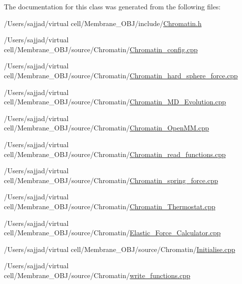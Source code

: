 The documentation for this class was generated from the following files\+:\begin{DoxyCompactItemize}
\item 
/\+Users/sajjad/virtual cell/\+Membrane\+\_\+\+O\+B\+J/include/\mbox{\hyperlink{Chromatin_8h}{Chromatin.\+h}}\item 
/\+Users/sajjad/virtual cell/\+Membrane\+\_\+\+O\+B\+J/source/\+Chromatin/\mbox{\hyperlink{Chromatin__config_8cpp}{Chromatin\+\_\+config.\+cpp}}\item 
/\+Users/sajjad/virtual cell/\+Membrane\+\_\+\+O\+B\+J/source/\+Chromatin/\mbox{\hyperlink{Chromatin__hard__sphere__force_8cpp}{Chromatin\+\_\+hard\+\_\+sphere\+\_\+force.\+cpp}}\item 
/\+Users/sajjad/virtual cell/\+Membrane\+\_\+\+O\+B\+J/source/\+Chromatin/\mbox{\hyperlink{Chromatin__MD__Evolution_8cpp}{Chromatin\+\_\+\+M\+D\+\_\+\+Evolution.\+cpp}}\item 
/\+Users/sajjad/virtual cell/\+Membrane\+\_\+\+O\+B\+J/source/\+Chromatin/\mbox{\hyperlink{Chromatin__OpenMM_8cpp}{Chromatin\+\_\+\+Open\+M\+M.\+cpp}}\item 
/\+Users/sajjad/virtual cell/\+Membrane\+\_\+\+O\+B\+J/source/\+Chromatin/\mbox{\hyperlink{Chromatin__read__functions_8cpp}{Chromatin\+\_\+read\+\_\+functions.\+cpp}}\item 
/\+Users/sajjad/virtual cell/\+Membrane\+\_\+\+O\+B\+J/source/\+Chromatin/\mbox{\hyperlink{Chromatin__spring__force_8cpp}{Chromatin\+\_\+spring\+\_\+force.\+cpp}}\item 
/\+Users/sajjad/virtual cell/\+Membrane\+\_\+\+O\+B\+J/source/\+Chromatin/\mbox{\hyperlink{Chromatin__Thermostat_8cpp}{Chromatin\+\_\+\+Thermostat.\+cpp}}\item 
/\+Users/sajjad/virtual cell/\+Membrane\+\_\+\+O\+B\+J/source/\+Chromatin/\mbox{\hyperlink{Chromatin_2Elastic__Force__Calculator_8cpp}{Elastic\+\_\+\+Force\+\_\+\+Calculator.\+cpp}}\item 
/\+Users/sajjad/virtual cell/\+Membrane\+\_\+\+O\+B\+J/source/\+Chromatin/\mbox{\hyperlink{Chromatin_2Initialise_8cpp}{Initialise.\+cpp}}\item 
/\+Users/sajjad/virtual cell/\+Membrane\+\_\+\+O\+B\+J/source/\+Chromatin/\mbox{\hyperlink{Chromatin_2write__functions_8cpp}{write\+\_\+functions.\+cpp}}\end{DoxyCompactItemize}
